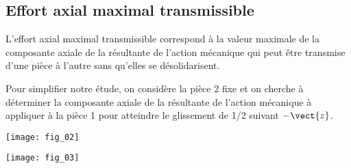\subsection*{Effort axial maximal transmissible}


L’effort axial maximal transmissible correspond à la valeur maximale de la 
composante axiale de la résultante de l’action mécanique qui peut être transmise 
d’une pièce à l’autre sans qu’elles se désolidarisent. 
 
Pour simplifier notre étude, on considère la pièce 2 fixe et on cherche à déterminer 
la composante axiale de la résultante de l’action mécanique à appliquer à la pièce 1 
pour atteindre le glissement de 1/2 suivant $-\vect{z}$. 


\begin{marginfigure}
\texttt{[image: fig\_02]}
\end{marginfigure}



\begin{marginfigure}
\texttt{[image: fig\_03]}
\end{marginfigure}




